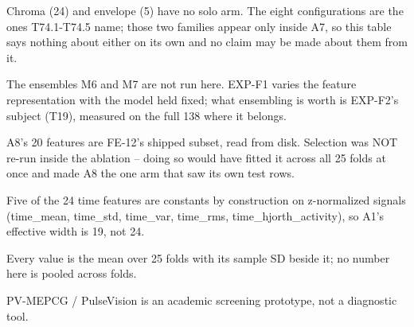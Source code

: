 \begin{table}[htbp]
\begin{tabular}{lrrrrrrrrrrrrrrrrrrrrrr}
    \bottomrule
  \end{tabular}
  \par\footnotesize Chroma (24) and envelope (5) have no solo arm. The eight configurations are the ones T74.1-T74.5 name; those two families appear only inside A7, so this table says nothing about either on its own and no claim may be made about them from it.
  \par\footnotesize The ensembles M6 and M7 are not run here. EXP-F1 varies the feature representation with the model held fixed; what ensembling is worth is EXP-F2's subject (T19), measured on the full 138 where it belongs.
  \par\footnotesize A8's 20 features are FE-12's shipped subset, read from disk. Selection was NOT re-run inside the ablation -- doing so would have fitted it across all 25 folds at once and made A8 the one arm that saw its own test rows.
  \par\footnotesize Five of the 24 time features are constants by construction on z-normalized signals (time\_mean, time\_std, time\_var, time\_rms, time\_hjorth\_activity), so A1's effective width is 19, not 24.
  \par\footnotesize Every value is the mean over 25 folds with its sample SD beside it; no number here is pooled across folds.
  \par\footnotesize PV-MEPCG / PulseVision is an academic screening prototype, not a diagnostic tool.
\end{table}
